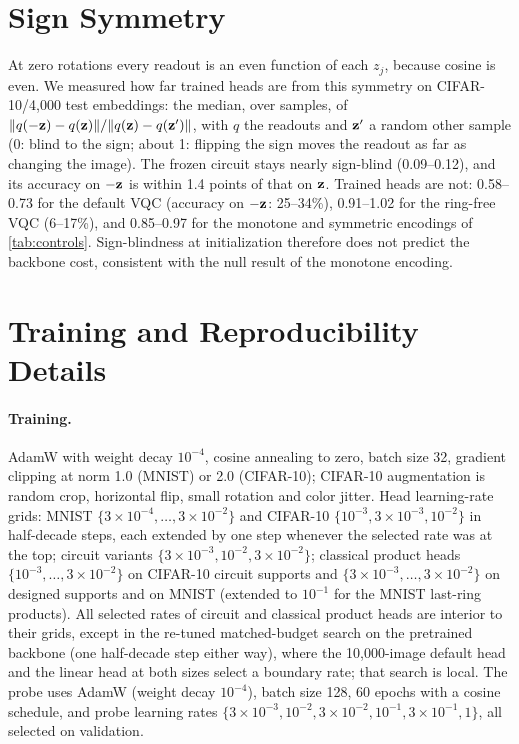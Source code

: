 \section{Sign Symmetry}
\label{app:sign}

At zero rotations every readout is an even function of each $z_j$, because cosine is even.
We measured how far trained heads are from this symmetry on CIFAR-10/4,000 test embeddings:
the median, over samples, of $\|q(-\mathbf{z})-q(\mathbf{z})\|/\|q(\mathbf{z})-q(\mathbf{z}')\|$, with $q$ the readouts
and $\mathbf{z}'$ a random other sample (0: blind to the sign; about 1: flipping the sign moves the
readout as far as changing the image). The frozen circuit stays nearly sign-blind
(0.09--0.12), and its accuracy on $-\mathbf{z}$ is within 1.4 points of that on $\mathbf{z}$. Trained heads
are not: 0.58--0.73 for the default VQC (accuracy on $-\mathbf{z}$: 25--34\%), 0.91--1.02 for the
ring-free VQC (6--17\%), and 0.85--0.97 for the monotone and symmetric encodings of
\cref{tab:controls}. Sign-blindness at initialization therefore does not predict the
backbone cost, consistent with the null result of the monotone encoding.

\section{Training and Reproducibility Details}
\label{app:repro}

\paragraph{Training.}
AdamW with weight decay $10^{-4}$, cosine annealing to zero, batch size 32, gradient clipping
at norm 1.0 (MNIST) or 2.0 (CIFAR-10); CIFAR-10 augmentation is random crop, horizontal flip,
small rotation and color jitter. Head learning-rate grids: MNIST
$\{3\times10^{-4},\dots,3\times10^{-2}\}$ and CIFAR-10 $\{10^{-3},3\times10^{-3},10^{-2}\}$ in
half-decade steps, each extended by one step whenever the selected rate was at the top; circuit
variants $\{3\times10^{-3},10^{-2},3\times10^{-2}\}$; classical product heads
$\{10^{-3},\dots,3\times10^{-2}\}$ on CIFAR-10 circuit supports and
$\{3\times10^{-3},\dots,3\times10^{-2}\}$ on designed supports and on MNIST (extended to
$10^{-1}$ for the MNIST last-ring products). All selected rates of circuit and classical product heads
are interior to their grids, except in the re-tuned matched-budget search on the pretrained
backbone (one half-decade step either way), where the 10,000-image default head and the linear
head at both sizes select a boundary rate; that search is local. The probe uses AdamW (weight decay $10^{-4}$), batch size 128,
60 epochs with a cosine schedule, and probe learning rates
$\{3\times10^{-3},10^{-2},3\times10^{-2},10^{-1},3\times10^{-1},1\}$, all selected on
validation.

